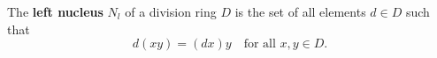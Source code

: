 The \textbf{left nucleus} $N_l$ of a division ring $D$ is the set of all elements $d \in D$ such that
$$d(xy) = (dx)y \quad \text{for all } x, y \in D.$$
